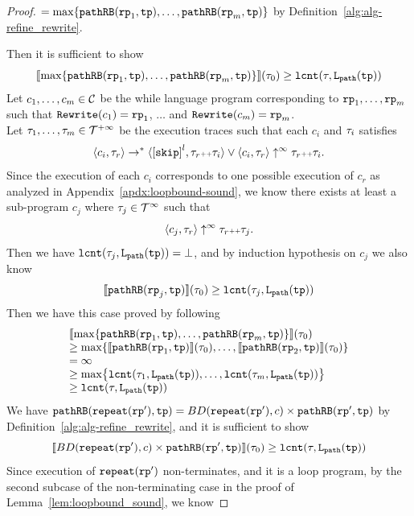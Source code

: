 \begin{proof}
 $ = \max\left\{ \inoutB(\rprog_1, \tpath), \ldots, \inoutB(\rprog_m, \tpath) \right\}$ by Definition~\ref{alg:alg-refine_rewrite}.

 Then it is sufficient to show
\[
  \econfig{\max\left\{ \inoutB(\rprog_1, \tpath), \ldots, \inoutB(\rprog_m, \tpath) \right\}}(\trace_0) \geq \lcounter(\trace, \pathl(\tpath)) 
\]
Let $c_1, \ldots, c_m \in \mathcal{C}$ be the while language program corresponding to $\mathtt{rp}_1, \ldots, \mathtt{rp}_m$ such that $\mathtt{Rewrite}(c_1) = \mathtt{rp}_1$, $\ldots$ and  $\mathtt{Rewrite}(c_m) = \mathtt{rp}_m$.
\\
Let $\mathtt{\tau}_1, \ldots, \mathtt{\tau}_m \in \mathcal{T}^{+\infty}$ be the execution traces such that each $c_i$ and $\mathtt{\tau}_i$ satisfies 
\[
  \config{c_i, \trace_r} \to^* 
  \config{\clabel{\eskip}^{l}, \trace_r \tracecat \trace_i}
  \lor 
  \config{c_i, \trace_r} \uparrow^{\infty}  \trace_r \tracecat \trace_i.
\]
Since the execution of each $c_i$ corresponds to one possible execution of $c_r$ as analyzed in Appendix~\ref{apdx:loopbound-sound}, we know there exists at least a sub-program $c_j$ where $\mathtt{\tau}_j \in \mathcal{T}^{\infty}$ such that
\[
  \langle c_j, \mathtt{\tau}_r \rangle \uparrow^{\infty} \mathtt{\tau}_r {\scriptscriptstyle ++} \mathtt{\tau}_j.
\]
Then we have $\mathtt{lcnt}(\mathtt{\tau}_j, \mathtt{L}_{\mathtt{path}}(\mathtt{tp}))  = \bot$, and by induction hypothesis on $c_j$ we also know 
\[
  \llbracket \mathtt{pathRB}(\mathtt{rp}_j, \mathtt{tp}) \rrbracket(\mathtt{\tau}_0) 
  \geq \mathtt{lcnt}(\mathtt{\tau}_j, \mathtt{L}_{\mathtt{path}}(\mathtt{tp})) 
\]
Then we have this case proved by following
\[
  \begin{array}{l}
    \econfig{\max\left\{ \inoutB(\rprog_1, \tpath), \ldots, \inoutB(\rprog_m, \tpath) \right\}}(\trace_0)
    \\
    \geq \max\left\{ \econfig{\inoutB(\rprog_1, \tpath)}(\trace_0), \ldots, \econfig{\inoutB(\rprog_2, \tpath)}(\trace_0)\right\}
    \\
    =  \infty
    \\
    \geq \max\left\{ \lcounter(\trace_1,  \pathl(\tpath)),  \ldots, \lcounter(\trace_m,  \pathl(\tpath))  \right\}
    \\
    \geq \lcounter(\trace, \pathl(\tpath))
    \end{array}
  \]
We have $\mathtt{pathRB}(\mathtt{repeat}(\mathtt{rp}'), \mathtt{tp}) = BD(\mathtt{repeat}(\mathtt{rp}'), c) \times \mathtt{pathRB}(\mathtt{rp}', \mathtt{tp})$
by Definition~\ref{alg:alg-refine_rewrite}, and
it is sufficient to show
\[
  \llbracket  BD(\mathtt{repeat}(\mathtt{rp}'), c) \times \mathtt{pathRB}(\mathtt{rp}', \mathtt{tp}) \rrbracket (\mathtt{\tau}_0) \geq \mathtt{lcnt}(\mathtt{\tau}, \mathtt{L}_{\mathtt{path}}(\mathtt{tp})) 
\]
Since execution of $\mathtt{repeat}(\mathtt{rp}')$ non-terminates, and it is a loop program,
by the second subcase of the non-terminating case in the proof of Lemma~\ref{lem:loopbound_sound}, we know

\end{proof}
